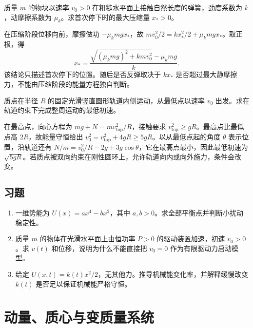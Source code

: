 \documentclass[UTF8,12pt,a4paper,fontset=fandol]{ctexbook}
\begin{document}
\begin{example}[弹簧压缩与摩擦耗能]
质量 $m$ 的物块以速率 $v_0>0$ 在粗糙水平面上接触自然长度的弹簧，劲度系数为 $k$，动摩擦系数为 $\mu_k$。求首次停下时的最大压缩量 $x_*>0$。
\end{example}
\begin{solve}
在压缩阶段位移向前，摩擦做功 $-\mu_kmgx_*$，故 $mv_0^2/2=kx_*^2/2+\mu_kmgx_*$。取正根，得
\[
 x_* =\frac{\sqrt{(\mu_kmg)^2+kmv_0^2}-\mu_kmg}{k}.
\]
该结论只描述首次停下的位置。随后是否反弹取决于 $kx_*$ 是否超过最大静摩擦力，不能由压缩阶段的能量方程独自判断。
\end{solve}

\begin{example}[竖直圆轨道的接触条件]
质点在半径 $R$ 的固定光滑竖直圆形轨道内侧运动，从最低点以速率 $v_0$ 出发。求在轨道约束下完成整周运动的最低初速。
\end{example}
\begin{solve}
在最高点，向心方程为 $mg+N=mv_{\mathrm{top}}^2/R$，接触要求 $v_{\mathrm{top}}^2\ge gR$。最高点比最低点高 $2R$，故能量守恒给出 $v_0^2=v_{\mathrm{top}}^2+4gR\ge5gR$。以从最低点起的角度 $\theta$ 表示位置，沿轨道还有 $N/m=v_0^2/R-2g+3g\cos\theta$，它在最高点最小，因此最低初速为 $\sqrt{5gR}$。若质点被双向约束在刚性圆环上，允许轨道向内或向外施力，条件会改变。
\end{solve}

\section{习题}
\begin{enumerate}[label=\thechapter.\arabic*,ref=\thechapter.\arabic*]
\item\label{exr:mech-potential} 一维势能为 $U(x)=ax^4-bx^2$，其中 $a,b>0$。求全部平衡点并判断小扰动稳定性。
\item\label{exr:mech-power} 质量 $m$ 的物体在光滑水平面上由恒功率 $P>0$ 的驱动装置加速，初速 $v_0>0$。求 $v(t)$ 和位移，说明为什么不能直接把 $v_0=0$ 作为有限驱动力启动模型。
\item\label{exr:mech-timed-u} 给定 $U(x,t)=k(t)x^2/2$，无其他力。推导机械能变化率，并解释缓慢改变 $k(t)$ 是否足以保证机械能严格守恒。
\end{enumerate}

\chapter{动量、质心与变质量系统}
\label{chap:mech-momentum}
\end{document}
